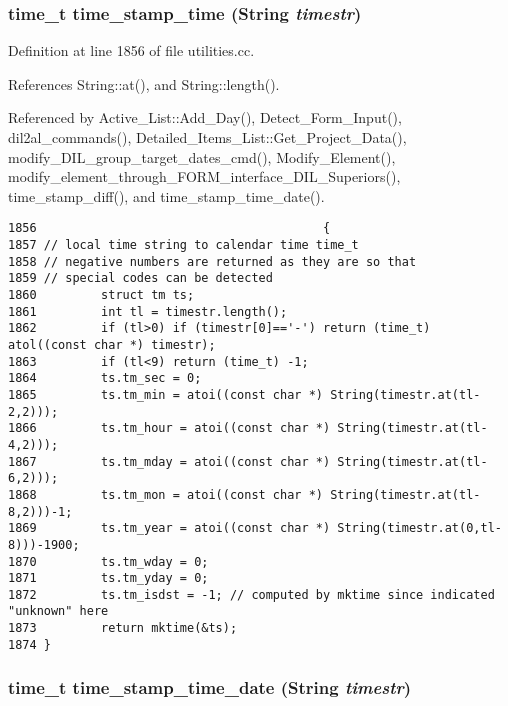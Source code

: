 \subsubsection{\setlength{\rightskip}{0pt plus 5cm}time\_\-t time\_\-stamp\_\-time ({\bf String} {\em timestr})}\label{utilities_8cc_a23}




Definition at line 1856 of file utilities.cc.

References String::at(), and String::length().

Referenced by Active\_\-List::Add\_\-Day(), Detect\_\-Form\_\-Input(), dil2al\_\-commands(), Detailed\_\-Items\_\-List::Get\_\-Project\_\-Data(), modify\_\-DIL\_\-group\_\-target\_\-dates\_\-cmd(), Modify\_\-Element(), modify\_\-element\_\-through\_\-FORM\_\-interface\_\-DIL\_\-Superiors(), time\_\-stamp\_\-diff(), and time\_\-stamp\_\-time\_\-date().



\footnotesize\begin{verbatim}1856                                        {
1857 // local time string to calendar time time_t
1858 // negative numbers are returned as they are so that
1859 // special codes can be detected
1860         struct tm ts;
1861         int tl = timestr.length();
1862         if (tl>0) if (timestr[0]=='-') return (time_t) atol((const char *) timestr);
1863         if (tl<9) return (time_t) -1;
1864         ts.tm_sec = 0;
1865         ts.tm_min = atoi((const char *) String(timestr.at(tl-2,2)));
1866         ts.tm_hour = atoi((const char *) String(timestr.at(tl-4,2)));
1867         ts.tm_mday = atoi((const char *) String(timestr.at(tl-6,2)));
1868         ts.tm_mon = atoi((const char *) String(timestr.at(tl-8,2)))-1;
1869         ts.tm_year = atoi((const char *) String(timestr.at(0,tl-8)))-1900;
1870         ts.tm_wday = 0;
1871         ts.tm_yday = 0;
1872         ts.tm_isdst = -1; // computed by mktime since indicated "unknown" here
1873         return mktime(&ts);
1874 }
\end{verbatim}\normalsize 
{}
\subsubsection{\setlength{\rightskip}{0pt plus 5cm}time\_\-t time\_\-stamp\_\-time\_\-date ({\bf String} {\em timestr})}\label{utilities_8cc_a25}




